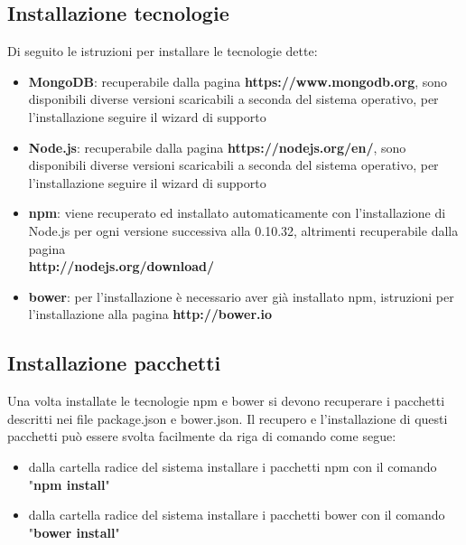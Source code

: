 \subsection{Installazione tecnologie}
Di seguito le istruzioni per installare le tecnologie dette:
\begin{itemize}
\item \textbf{MongoDB}: recuperabile dalla pagina \textbf{https://www.mongodb.org}, sono disponibili diverse versioni scaricabili a seconda del sistema operativo, per l'installazione seguire il wizard di supporto
\item \textbf{Node.js}: recuperabile dalla pagina \textbf{https://nodejs.org/en/}, sono disponibili diverse versioni scaricabili a seconda del sistema operativo, per l'installazione seguire il wizard di supporto
\item \textbf{npm}: viene recuperato ed installato automaticamente con l'installazione di Node.js per ogni versione successiva alla 0.10.32, altrimenti recuperabile dalla pagina \\ \textbf{http://nodejs.org/download/}
\item \textbf{bower}: per l'installazione \`{e} necessario aver gi\`{a} installato npm, istruzioni per l'installazione alla pagina \textbf{http://bower.io}
\end{itemize}

\subsection{Installazione pacchetti}
Una volta installate le tecnologie npm e bower si devono recuperare i pacchetti descritti nei file package.json e bower.json.
Il recupero e l'installazione di questi pacchetti pu\`{o} essere svolta facilmente da riga di comando come segue:
\begin{itemize}
\item dalla cartella radice del sistema installare i pacchetti npm con il comando "\textbf{npm install}"
\item dalla cartella radice del sistema installare i pacchetti bower con il comando "\textbf{bower install}"
\end{itemize}

